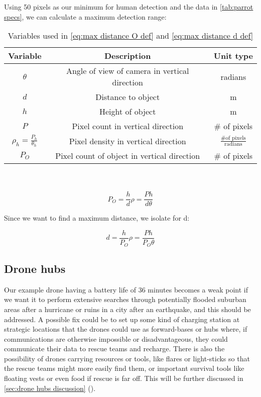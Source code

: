\documentclass[fleqn,10pt]{wlscirep}
\newcommand{\cnref}[1]{\cref{#1} (\nameref{#1})}
\begin{document}
Using 50 pixels as our minimum for human detection and the data in \cref{tab:parrot specs}, we can calculate a maximum detection range:
\begin{table}[h]
\centering
\caption{Variables used in \cref{eq:max distance O def} and \cref{eq:max distance d def}}
\label{tab:max distance variables}
\begin{tabular}{|c|c|c|}
	\hline
	Variable & Description & Unit type \\	
	\hline
	$\theta$ & Angle of view of camera in vertical direction & radians\\
	$d$ & Distance to object & m \\
	$h$ & Height of object & m \\
	$P$ & Pixel count in vertical direction & \# of pixels \\
	\hline
	$\rho_h = \frac{P_h}{\theta_h}$ & Pixel density in vertical direction & $\frac{\text{\# of pixels}}{\text{radians}}$ \\
	\hline
	$P_O$ & Pixel count of object in vertical direction & \# of pixels \\
	\hline
\end{tabular}
\end{table}
\\\\


\begin{equation}
  P_O = \frac{h}{d}\rho = \frac{Ph}{d\theta}
  \label{eq:max distance O def}
\end{equation}


Since we want to find a maximum distance, we isolate for d:


\begin{equation}
\label{eq:max distance d def}
d = \frac{h}{P_O}\rho = \frac{Ph}{P_O\theta}
\end{equation}


\subsection{Drone hubs} \label{sec:Drone hubs}
Our example drone having a battery life of 36 minutes becomes a weak point if we want it to perform extensive searches through potentially flooded suburban areas after a hurricane or ruins in a city after an earthquake, and this should be addressed. A possible fix could be to set up some kind of charging station at strategic locations that the drones could use as forward-bases or hubs where, if communications are otherwise impossible or disadvantageous, they could communicate their data to rescue teams and recharge. There is also the possibility of drones carrying resources or tools, like flares or light-sticks so that the rescue teams might more easily find them, or important survival tools like floating vests or even food if rescue is far off. This will be further discussed in \cnref{sec:drone hubs discussion}.
\end{document}
